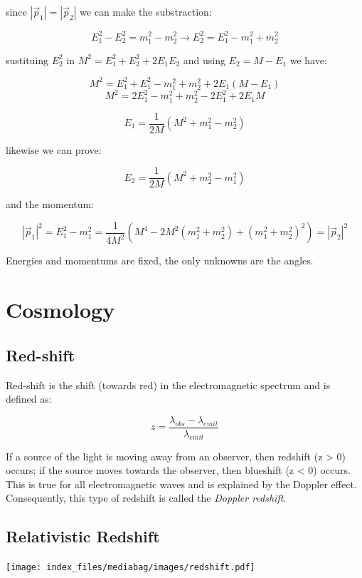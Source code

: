 \documentclass[
  letterpaper,
  DIV=11,
  numbers=noendperiod]{scrreprt}
\begin{document}
since \(|{\vec p_1}| = |{\vec p_2}|\) we can make the substraction:

\[E_1^2 - E_2^2 = m_1^2 - m_2^2 \rightarrow E_2^2 = E_1^2 - m_1^2 + m_2^2\]

sustituing \(E_2^2\) in \(M^2 = E_1^2 + E_2^2 + 2E_1 E_2\) and using
\(E_2 = M - E_1\) we have:

\[M^2 = E_1^2 + E_1^2 - m_1^2 + m_2^2 + 2E_1(M- E_1) \]
\[M^2 = 2E_1^2 - m_1^2 + m_2^2 - 2E_1^2 + 2E_1M\]

\[E_1 = \frac{1}{2M}(M^2 + m_1^2 - m_2^2)\]

likewise we can prove:

\[E_2 = \frac{1}{2M}(M^2 + m_2^2 - m_1^2)\]

and the momentum:

\[{|\vec p_1|^2} = E_1^2 - m_1^2 = \frac{1}{4M^2}(M^4 - 2M^2(m_1^2 + m_2^2) + (m_1^2 + m_2^2)^2) = {|\vec p_2|^2}\]

Energies and momentums are fixed, the only unknowns are the angles.

\section{Cosmology}\label{cosmology}

\subsection{Red-shift}\label{red-shift}

Red-shift is the shift (towards red) in the electromagnetic spectrum and
is defined as:

\[z=\frac{\lambda_{obs} - \lambda_{emit}}{\lambda_{emit}}\]

If a source of the light is moving away from an observer, then redshift
(z \textgreater{} 0) occurs; if the source moves towards the observer,
then blueshift (z \textless{} 0) occurs. This is true for all
electromagnetic waves and is explained by the Doppler effect.
Consequently, this type of redshift is called the \emph{Doppler
redshift}.

\subsection{Relativistic Redshift}\label{relativistic-redshift}

\begin{center}
\texttt{[image: index\_files/mediabag/images/redshift.pdf]}
\end{center}
\end{document}
